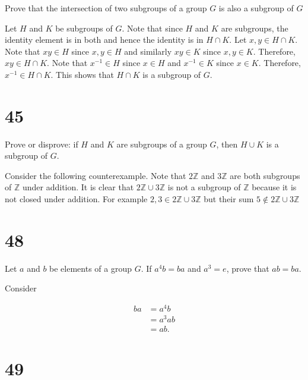 \documentclass[a4paper]{article}
\begin{document}
Prove that the intersection of two subgroups of a group $G$ is also a subgroup of $G$

\vspace{\baselineskip}

Let $H$ and $K$ be subgroups of $G$. Note that since $H$ and $K$ are subgroups, the identity element is in both and hence the identity is in $H \cap K$. Let $x,y \in H \cap K$. Note that $xy \in H$ since $x,y \in H$ and similarly $xy \in K$ since $x,y \in K$. Therefore, $xy \in H \cap K$. Note that $x^{-1} \in H$ since $x \in H$ and $x^{-1} \in K$ since $x \in K$. Therefore, $x^{-1} \in H \cap K$. This shows that $H \cap K$ is a subgroup of $G$.



\section*{45}

Prove or disprove: if $H$ and $K$ are subgroups of a group $G$, then $H \cup K$ is a subgroup of $G$.

\vspace{\baselineskip}

Consider the following counterexample. Note that $2\mathbb{Z}$ and $3\mathbb{Z}$ are both subgroups of $\mathbb{Z}$ under addition. It is clear that $2\mathbb{Z} \cup 3\mathbb{Z}$ is not a subgroup of $\mathbb{Z}$ because it is not closed under addition. For example $2,3 \in 2\mathbb{Z} \cup 3\mathbb{Z}$ but their sum $5 \not\in 2\mathbb{Z} \cup 3\mathbb{Z}$


\section*{48}

Let $a$ and $b$ be elements of a group $G$. If $a^4b = ba$ and $a^3 = e$, prove that $ab = ba$.

\vspace{\baselineskip}

Consider

\begin{align*}
ba &= a^4b \\
&= a^3 ab \\
&= ab.
\end{align*}


\section*{49}
\end{document}
